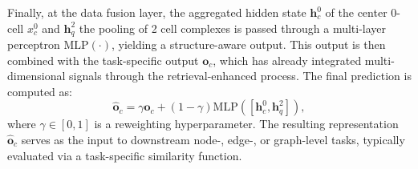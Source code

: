 Finally, at the data fusion layer, the aggregated hidden state \( \bm{h}^0_c \) of the center 0-cell \( x_c^0 \) and \( \bm{h}^2_q \) the pooling of 2 cell complexes is passed through a multi-layer perceptron  \( \text{MLP}(\cdot) \), yielding a structure-aware output. This output is then combined with the task-specific output \( \bm{o}_c \), which has already integrated multi-dimensional signals through the retrieval-enhanced process. The final prediction is computed as:
\begin{equation}
\hat{\bm{o}}_c = \gamma \bm{o}_c + (1 - \gamma) \text{MLP}([\bm{h}^0_c, \bm{h}^2_q]),
\end{equation}
where \( \gamma \in [0, 1] \) is a reweighting hyperparameter. The resulting representation \( \hat{\bm{o}}_c \) serves as the input to downstream node-, edge-, or graph-level tasks, typically evaluated via a task-specific similarity function.













